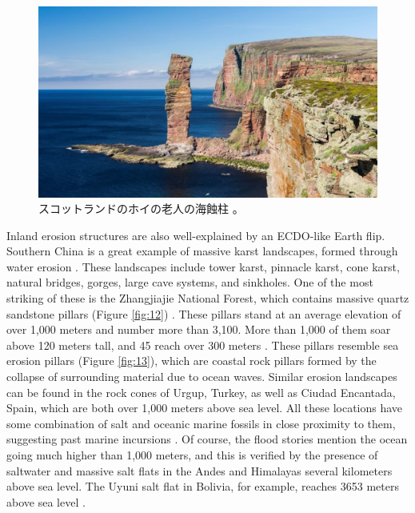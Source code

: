 \documentclass[10pt,twocolumn,letterpaper]{article}
\begin{document}
\begin{figure}[b]
\begin{center}
   \includegraphics[width=1\linewidth]{hoy.jpg}
\end{center}
   \caption{スコットランドのホイの老人の海蝕柱 \cite{83}。}
\label{fig:13}
\label{fig:onecol}
\end{figure}
Inland erosion structures are also well-explained by an ECDO-like Earth flip. Southern China is a great example of massive karst landscapes, formed through water erosion \cite{82}. These landscapes include tower karst, pinnacle karst, cone karst, natural bridges, gorges, large cave systems, and sinkholes. One of the most striking of these is the Zhangjiajie National Forest, which contains massive quartz sandstone pillars (Figure \ref{fig:12}) \cite{84}. These pillars stand at an average elevation of over 1,000 meters and number more than 3,100. More than 1,000 of them soar above 120 meters tall, and 45 reach over 300 meters \cite{85}. These pillars resemble sea erosion pillars (Figure \ref{fig:13}), which are coastal rock pillars formed by the collapse of surrounding material due to ocean waves. Similar erosion landscapes can be found in the rock cones of Urgup, Turkey, as well as Ciudad Encantada, Spain, which are both over 1,000 meters above sea level. All these locations have some combination of salt and oceanic marine fossils in close proximity to them, suggesting past marine incursions \cite{15,86,87}. Of course, the flood stories \cite{3} mention the ocean going much higher than 1,000 meters, and this is verified by the presence of saltwater and massive salt flats in the Andes and Himalayas several kilometers above sea level. The Uyuni salt flat in Bolivia, for example, reaches 3653 meters above sea level \cite{94}.
\end{document}
